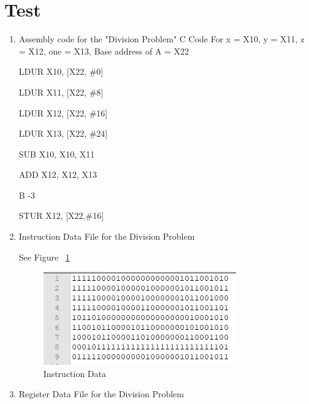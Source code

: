 \documentclass{article}
\begin{document}
\section{Test}
\begin{enumerate}
	\item Assembly code for the "Division Problem" C Code
	For x = X10, y = X11, z = X12, one = X13, Base address of A = X22
	
	 LDUR X10, [X22, \#0]
	 
	 LDUR X11, [X22, \#8]
	 
	 LDUR X12, [X22, \#16]
	 
	 LDUR X13, [X22, \#24]
	 
	 SUB X10, X10, X11
	 
	 ADD X12, X12, X13
	 
	 B -3
	 
	 STUR X12, [X22,\#16]
	
	\item Instruction Data File for the Division Problem
	
	See Figure ~\ref{fig:instruction data}
	\begin{figure}
		\caption{Instruction Data}\label{fig:instruction data}
		\begin{center}
		\includegraphics[width=\textwidth]{../images/instra_data2.png}
	\end{center}
\end{figure}

	\item Register Data File for the Division Problem
	

\end{enumerate}
\end{document}
